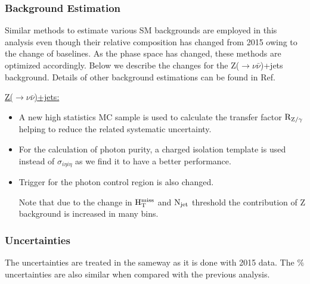 \subsubsection{Background Estimation}
Similar methods to estimate various SM backgrounds are employed in this analysis even though their relative composition has changed from 2015 owing to the change of baselines. As the phase space has changed, these methods are optimized accordingly. Below we describe the changes for the Z($\rightarrow \nu \bar{\nu}$)+jets background. Details of other background estimations can be found in Ref.~\cite{CMS-PAS-SUS-16-014}

\underline{Z($\rightarrow \nu \bar{\nu}$)+jets: } 

\begin{itemize}

\item A new high statistics MC sample is used to calculate the transfer factor $\rm R_{Z/\gamma}$ helping to  reduce the related systematic uncertainty.

\item For the calculation of photon purity, a charged isolation template is used instead of $\sigma_{i\eta i\eta}$ as we find it to have a better performance.

\item Trigger for the photon control region is also changed. 

Note that due to the change in $\rm H_{T}^{miss}$ and $\rm N_{jet}$ threshold the contribution of Z background is increased in many bins.

\end{itemize}

\subsubsection{Uncertainties}

The uncertainties are treated in the sameway as it is done with 2015 data. The $\%$ uncertainties are also similar when compared with the previous analysis.




